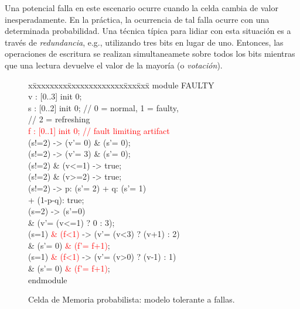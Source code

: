 Una potencial falla en este escenario ocurre cuando la celda cambia de valor inesperadamente. %
En la práctica, la ocurrencia de tal falla ocurre con una determinada probabilidad. Una técnica típica para lidiar con esta situación es a través de \emph{redundancia}, %
e.g., utilizando tres bits en lugar de uno. Entonces, las operaciones de escritura se realizan simultaneamete sobre todos los bits mientras que una lectura devuelve el valor de la mayoría (o \emph{votación}).
\begin{figure}[t]
\centering
\begin{minipage}[t]{.47\textwidth}
\fontsize{10}{10}\selectfont\ttfamily
\begin{tabbing}
x\=xxxxxxxx\=xxxxxxxxxxxxx\=xxx\=xxx\= \kill    
module FAULTY\\[1ex]
\>v : [0..3] init 0;\\
\>s : [0..2] init 0; \>\>// 0 = normal, 1 = faulty,\\
\>                   \>\>// 2 = refreshing\\
\>\textcolor{red}{f : [0..1] init 0;} \>\>\textcolor{red}{// fault limiting artifact}\\[1ex]
\>[w0]    \>(s!=2)           \>\>-> \>(v'= 0) \& (s'= 0);\\
\>[w1]    \>(s!=2)           \>\>-> \>(v'= 3) \& (s'= 0);\\
\>[r0]    \>(s!=2) \& (v<=1) \>\>-> \>true;\\
\>[r1]    \>(s!=2) \& (v>=2) \>\>-> \>true;\\
\>[tick]  \>(s!=2)           \>\>-> \>p: (s'= 2) + q: (s'= 1) \\
\>        \>                 \>\>   \>+ (1-p-q): true;\\
\>[rfsh]  \>(s=2)            \>\>-> \>(s'=0)\\
\>        \>                 \>\>   \>\& (v'= (v<=1) ? 0 : 3);\\
\>[fault] \>(s=1) \textcolor{red}{\& (f<1)}   \>\>-> \>(v'= (v<3) ? (v+1) : 2) \\
\>        \>                 \>\>   \>\& (s'= 0) \textcolor{red}{\& (f'= f+1)};\\
\>[fault] \>(s=1) \textcolor{red}{\& (f<1)}    \>\>-> \>(v'= (v>0) ? (v-1) : 1) \\
\>        \>                 \>\>   \>\& (s'= 0) \textcolor{red}{\& (f'= f+1)};\\[1ex]
endmodule\\[-2em]
\end{tabbing}
 
\end{minipage}
\vspace{2ex}
\caption{Celda de Memoria probabilista: modelo tolerante a fallas.} \label{fig:exam_1_mem_cell:ft}
\end{figure}
%

